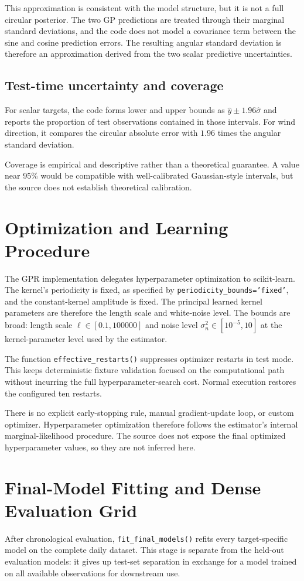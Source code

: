 \documentclass[11pt,a4paper]{article}
\newcommand{\code}[1]{\texttt{#1}}
\begin{document}
This approximation is consistent with the model structure, but it is not a full circular posterior. The two GP predictions are treated through their marginal standard deviations, and the code does not model a covariance term between the sine and cosine prediction errors. The resulting angular standard deviation is therefore an approximation derived from the two scalar predictive uncertainties.

\subsection{Test-time uncertainty and coverage}
For scalar targets, the code forms lower and upper bounds as $\hat y\pm1.96\hat\sigma$ and reports the proportion of test observations contained in those intervals. For wind direction, it compares the circular absolute error with $1.96$ times the angular standard deviation.

Coverage is empirical and descriptive rather than a theoretical guarantee. A value near 95\% would be compatible with well-calibrated Gaussian-style intervals, but the source does not establish theoretical calibration.

\section{Optimization and Learning Procedure}
The GPR implementation delegates hyperparameter optimization to scikit-learn. The kernel's periodicity is fixed, as specified by \code{periodicity\_bounds='fixed'}, and the constant-kernel amplitude is fixed. The principal learned kernel parameters are therefore the length scale and white-noise level. The bounds are broad: length scale $\ell\in[0.1,100000]$ and noise level $\sigma_n^2\in[10^{-5},10]$ at the kernel-parameter level used by the estimator.

The function \code{effective\_restarts()} suppresses optimizer restarts in test mode. This keeps deterministic fixture validation focused on the computational path without incurring the full hyperparameter-search cost. Normal execution restores the configured ten restarts.

There is no explicit early-stopping rule, manual gradient-update loop, or custom optimizer. Hyperparameter optimization therefore follows the estimator's internal marginal-likelihood procedure. The source does not expose the final optimized hyperparameter values, so they are not inferred here.

\section{Final-Model Fitting and Dense Evaluation Grid}
After chronological evaluation, \code{fit\_final\_models()} refits every target-specific model on the complete daily dataset. This stage is separate from the held-out evaluation models: it gives up test-set separation in exchange for a model trained on all available observations for downstream use.
\end{document}
